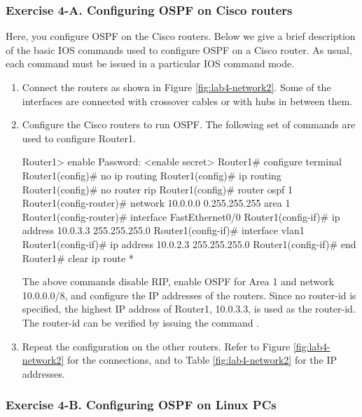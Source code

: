 \subsubsection*{Exercise 4-A. Configuring OSPF on Cisco routers}

Here, you configure OSPF on the Cisco routers. Below we give a brief description of the basic IOS commands used to configure OSPF on a Cisco router. As usual, each command must be issued in a particular IOS command mode.

\begin{enumerate}
	\item Connect the routers as shown in Figure \ref{fig:lab4-network2}. Some of the interfaces are connected with crossover cables or with hubs in between them.
	\item Configure the Cisco routers to run OSPF. The following set of commands are used to configure Router1.
		\begin{cmdblock}
	Router1> enable
	Password: <enable secret>
	Router1# configure terminal
	Router1(config)# no ip routing
	Router1(config)# ip routing
	Router1(config)# no router rip
	Router1(config)# router ospf 1
	Router1(config-router)# network 10.0.0.0 0.255.255.255 area 1 
	Router1(config-router)# interface FastEthernet0/0 
	Router1(config-if)# ip address 10.0.3.3 255.255.255.0 
	Router1(config-if)# interface vlan1
	Router1(config-if)# ip address 10.0.2.3 255.255.255.0
	Router1(config-if)# end 
	Router1# clear ip route *
		\end{cmdblock}
		The above commands disable RIP, enable OSPF for Area 1 and network 10.0.0.0/8, and configure the IP addresses of the routers. Since no router-id is specified, the highest IP address of Router1, 10.0.3.3, is used as the router-id. The router-id can be verified by issuing the command .
	\item Repeat the configuration on the other routers. Refer to Figure \ref{fig:lab4-network2} for the connections, and to Table \ref{fig:lab4-network2} for the IP addresses.
\end{enumerate}

\subsubsection*{Exercise 4-B. Configuring OSPF on Linux PCs}

